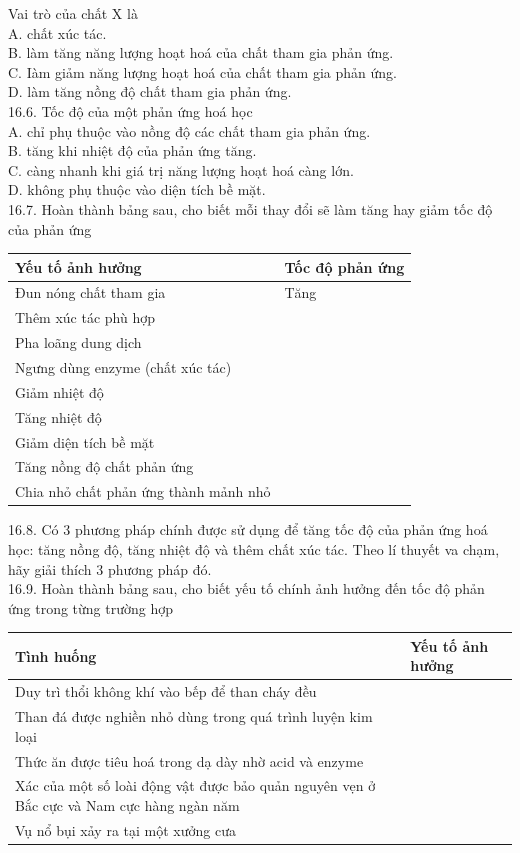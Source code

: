 \documentclass[10pt]{article}
\begin{document}
Vai trò của chất X là\\
A. chất xúc tác.\\
B. làm tăng năng lượng hoạt hoá của chất tham gia phản ứng.\\
C. Iàm giảm năng lượng hoạt hoá của chất tham gia phản ứng.\\
D. làm tăng nồng độ chất tham gia phản ứng.\\
16.6. Tốc độ của một phản ứng hoá học\\
A. chỉ phụ thuộc vào nồng độ các chất tham gia phản ứng.\\
B. tăng khi nhiệt độ của phản ứng tăng.\\
C. càng nhanh khi giá trị năng lượng hoạt hoá càng lớn.\\
D. không phụ thuộc vào diện tích bề mặt.\\
16.7. Hoàn thành bảng sau, cho biết mỗi thay đổi sẽ làm tăng hay giảm tốc độ của phản ứng

\begin{center}
\begin{tabular}{|l|l|}
\hline
Yếu tố ảnh hưởng & Tốc độ phản ứng \\
\hline
Đun nóng chất tham gia & Tăng \\
\hline
Thêm xúc tác phù hợp &  \\
\hline
Pha loãng dung dịch &  \\
\hline
Ngưng dùng enzyme (chất xúc tác) &  \\
\hline
Giảm nhiệt độ &  \\
\hline
Tăng nhiệt độ &  \\
\hline
Giảm diện tích bề mặt &  \\
\hline
Tăng nồng độ chất phản ứng &  \\
\hline
Chia nhỏ chất phản ứng thành mảnh nhỏ &  \\
\hline
\end{tabular}
\end{center}

16.8. Có 3 phương pháp chính được sử dụng để tăng tốc độ của phản ứng hoá học: tăng nồng độ, tăng nhiệt độ và thêm chất xúc tác. Theo lí thuyết va chạm, hãy giải thích 3 phương pháp đó.\\
16.9. Hoàn thành bảng sau, cho biết yếu tố chính ảnh hưởng đến tốc độ phản ứng trong từng trường hợp

\begin{center}
\begin{tabular}{|l|l|}
\hline
Tình huống & Yếu tố ảnh hưởng \\
\hline
Duy trì thổi không khí vào bếp để than cháy đều &  \\
\hline
Than đá được nghiền nhỏ dùng trong quá trình luyện kim loại &  \\
\hline
Thức ăn được tiêu hoá trong dạ dày nhờ acid và enzyme &  \\
\hline
Xác của một số loài động vật được bảo quản nguyên vẹn ở Bắc cực và Nam cực hàng ngàn năm &  \\
\hline
Vụ nổ bụi xảy ra tại một xưởng cưa &  \\
\hline
\end{tabular}
\end{center}
\end{document}
